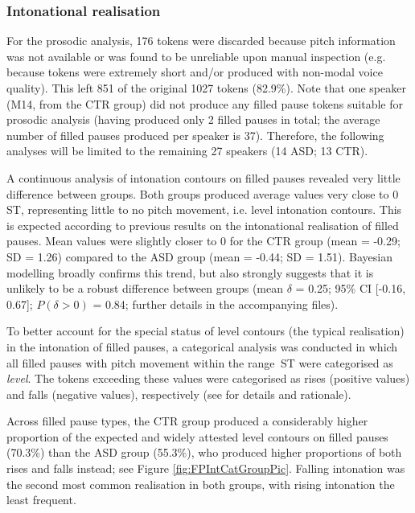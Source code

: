 \subsubsection{Intonational realisation}\label{BCFP_FP_results_intonation}

For the prosodic analysis, 176 tokens were discarded because pitch information was not available or was found to be unreliable upon manual inspection (e.g. because tokens were extremely short and/or produced with non-modal voice quality). This left 851 of the original 1027 tokens (82.9\%). Note that one speaker (M14, from the CTR group) did not produce any filled pause tokens suitable for prosodic analysis (having produced only 2 filled pauses in total; the average number of filled pauses produced per speaker is 37). Therefore, the following analyses will be limited to the remaining 27 speakers (14 ASD; 13 CTR).

\label{BCFP_FP_results_intonation_continuous}

A continuous analysis of intonation contours on filled pauses revealed very little difference between groups. Both groups produced average values very close to 0 ST, representing little to no pitch movement, i.e. level intonation contours. This is expected according to previous results on the intonational realisation of filled pauses. Mean values were slightly closer to 0 for the CTR group (mean = -0.29; SD = 1.26) compared to the ASD group (mean = -0.44; SD = 1.51). Bayesian modelling broadly confirms this trend, but also strongly suggests that it is unlikely to be a robust difference between groups (mean \(\delta\) = 0.25; 95\% CI {[}-0.16, 0.67{]}; \(P(\delta > 0)\) = 0.84; further details in the accompanying files).

\label{BCFP_FP_results_intonation_categorical}

To better account for the special status of level contours (the typical realisation) in the intonation of filled pauses, a categorical analysis was conducted in which all filled pauses with pitch movement within the range  ST were categorised as \textit{level}. The tokens exceeding these values were categorised as rises (positive values) and falls (negative values), respectively (see  for details and rationale).

Across filled pause types, the CTR group produced a considerably higher proportion of the expected and widely attested level contours on filled pauses (70.3\%) than the ASD group (55.3\%), who produced higher proportions of both rises and falls instead; see Figure \ref{fig:FPIntCatGroupPic}. Falling intonation was the second most common realisation in both groups, with rising intonation the least frequent. 

